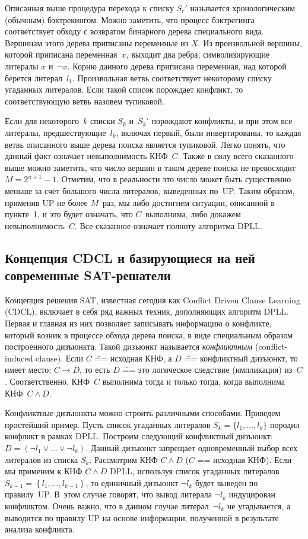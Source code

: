 Описанная выше процедура перехода к списку $S_{r}'$ называется хронологическим (обычным) бэктрекингом. Можно заметить, что процесс бэктрегинга соответствует обходу с возвратом бинарного дерева специального вида. Вершинам этого дерева приписаны переменные из $X$. Из произвольной вершины, которой приписана переменная~$x$, выходит два ребра, символизирующие литералы $x$ и~$\neg x$.
Корню данного дерева приписана переменная, над которой берется литерал~$l_{1}$.
Произвольная ветвь соответствует некоторому списку угаданных литералов.
Если такой список порождает конфликт, то соответствующую ветвь назовем тупиковой.

Если для некоторого~$k$ списки $S_{k}$ и~$S_{k}'$ порождают конфликты, и при этом все литералы, предшествующие~$l_{k}$, включая первый, были инвертированы, то каждая ветвь описанного выше дерева поиска является тупиковой.
Легко понять, что данный факт означает невыполнимость КНФ~$C$.
Также в силу всего сказанного выше можно заметить, что число вершин в таком дереве поиска не превосходит $M = 2^{n + 1} - 1$.
Отметим, что в реальности это число может быть существенно меньше за счет большого числа литералов, выведенных по~UP.
Таким образом, применив UP не более $M$~раз, мы либо достигнем ситуации, описанной в пункте~1, и это будет означать, что $C$~выполнима, либо докажем невыполнимость~$C$.
Все сказанное означает полноту алгоритма DPLL.

\subsection{Концепция CDCL и базирующиеся на ней современные SAT-решатели}

Концепция решения SAT, известная сегодня как Conflict Driven Clause Learning (CDCL), включает в себя ряд важных техник, дополняющих алгоритм DPLL.
Первая и главная из них позволяет записывать информацию о конфликте, который возник в процессе обхода дерева поиска, в виде специальным образом построенного дизъюнкта.
Такой дизъюнкт называется \textit{конфликтным} (conflict-induced clause).
Если $C$ \=== исходная КНФ, а $D$ \=== конфликтный дизъюнкт, то имеет место: $C \to D$, то есть $D$ \=== это логическое следствие (импликация) из~$C$.
Соответственно, КНФ~$C$ выполнима тогда и только тогда, когда выполнима КНФ~$C \land D$.

Конфликтные дизъюнкты можно строить различными способами. Приведем простейший пример.
Пусть список угаданных литералов $S_{k} = \{ l_{1},\ldots,l_{k} \}$ породил конфликт в рамках DPLL.
Построим следующий конфликтный дизъюнкт: $D = (\neg l_{1} \lor \ldots \lor \neg l_{k})$.
Данный дизъюнкт запрещает одновременный выбор всех литералов из списка $S_{k}$.
Рассмотрим КНФ $C \land D$ ($C$ \=== исходная КНФ).
Если мы применим к КНФ $C \land D$ DPLL, используя список угаданных литералов $S_{k - 1} = \left\{ l_{1},\ldots,l_{k - 1} \right\}$, то единичный дизъюнкт $\neg l_{k}$ будет выведен по правилу~UP.
В~этом случае говорят, что вывод литерала $\neg l_{k}$ индуцирован конфликтом.
Очень важно, что в данном случае литерал~${\neg l}_{k}$ не угадывается, а выводится по правилу UP на основе информации, полученной в результате анализа конфликта.

